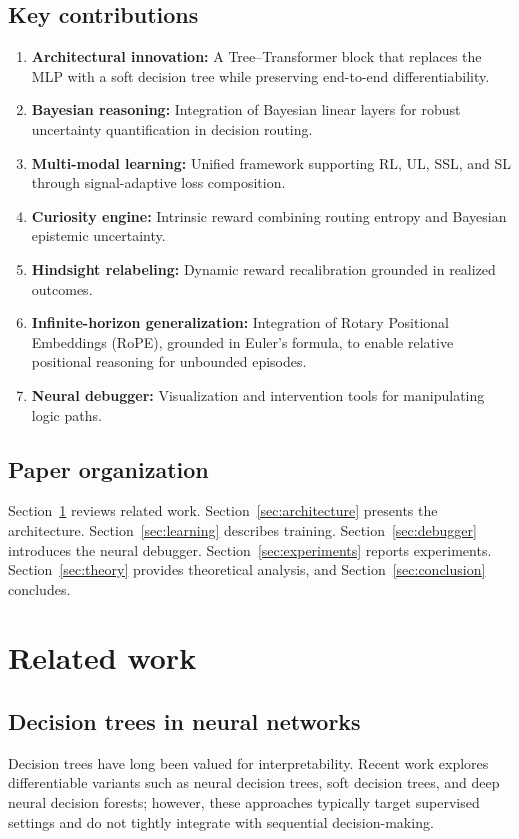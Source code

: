\documentclass[11pt]{article}
\begin{document}
\subsection{Key contributions}
\begin{enumerate}
\item \textbf{Architectural innovation:} A Tree--Transformer block that replaces the MLP with a soft decision tree while preserving end-to-end differentiability.
\item \textbf{Bayesian reasoning:} Integration of Bayesian linear layers for robust uncertainty quantification in decision routing.
\item \textbf{Multi-modal learning:} Unified framework supporting RL, UL, SSL, and SL through signal-adaptive loss composition.
\item \textbf{Curiosity engine:} Intrinsic reward combining routing entropy and Bayesian epistemic uncertainty.
\item \textbf{Hindsight relabeling:} Dynamic reward recalibration grounded in realized outcomes.
\item \textbf{Infinite-horizon generalization:} Integration of Rotary Positional Embeddings (RoPE), grounded in Euler's formula, to enable relative positional reasoning for unbounded episodes.
\item \textbf{Neural debugger:} Visualization and intervention tools for manipulating logic paths.
\end{enumerate}

\subsection{Paper organization}
Section~\ref{sec:related} reviews related work. Section~\ref{sec:architecture} presents the architecture. Section~\ref{sec:learning} describes training. Section~\ref{sec:debugger} introduces the neural debugger. Section~\ref{sec:experiments} reports experiments. Section~\ref{sec:theory} provides theoretical analysis, and Section~\ref{sec:conclusion} concludes.

\section{Related work}\label{sec:related}
\subsection{Decision trees in neural networks}
Decision trees have long been valued for interpretability. Recent work explores differentiable variants such as neural decision trees, soft decision trees, and deep neural decision forests; however, these approaches typically target supervised settings and do not tightly integrate with sequential decision-making.
\end{document}
